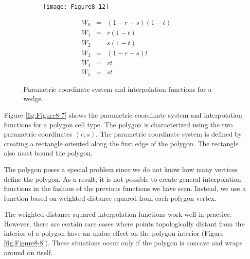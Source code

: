 \begin{description}[leftmargin=0cm,labelindent=0cm]
    \begin{figure}[!htb]
        \centering
        \begin{subfigure}{0.48\linewidth}
            \centering
            \texttt{[image: Figure8-12]}
            \caption*{}
        \end{subfigure}
        \hfill
        \begin{subfigure}{0.48\linewidth}
            \centering
            \begin{equation*}
            \begin{array}{lll}
            W_0 &=& (1 - r - s)(1 - t) \\
            W_1 &=& r (1-t) \\
            W_2 &=& s (1 - t) \\
            W_3 &=& (1 - r - s)t \\
            W_4 &=& r t \\
            W_5 &=& s t
            \end{array}
            \end{equation*}
        \end{subfigure}%
        \caption{Parametric coordinate system and interpolation functions for a wedge.}
        \label{fig:Figure8-12}
    \end{figure}

    \item[Polygon.\index{interpolation function!polygon}] Figure \ref{fig:Figure8-7} shows the parametric coordinate system and interpolation functions for a polygon cell type. The polygon is characterized using the two parametric coordinates $(r,s)$. The parametric coordinate system is defined by creating a rectangle oriented along the first edge of the polygon. The rectangle also must bound the polygon.

    The polygon poses a special problem since we do not know how many vertices define the polygon. As a result, it is not possible to create general interpolation functions in the fashion of the previous functions we have seen. Instead, we use a function based on weighted distance squared from each polygon vertex.

    The weighted distance squared interpolation functions work well in practice. However, there are certain rare cases where points topologically distant from the interior of a polygon have an undue effect on the polygon interior (Figure \ref{fig:Figure8-8}). These situations occur only if the polygon is concave and wraps around on itself.


\end{description}
